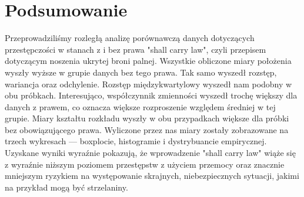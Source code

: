 \documentclass[a4paper,12pt]{article}
\begin{document}
	\newpage
	{\small \section{Podsumowanie}}
	Przeprowadziliśmy rozległą analizę porównawczą danych dotyczących przestępczości w stanach z i bez prawa "shall carry law", czyli przepisem dotyczącym noszenia ukrytej broni palnej. Wszystkie obliczone miary położenia wyszły wyższe w grupie danych bez tego prawa. Tak samo wyszedł rozstęp, wariancja oraz odchylenie. Rozstęp międzykwartylowy wyszedł nam podobny w obu próbkach. Interesująco, współczynnik zmienności wyszedł trochę większy dla danych z prawem, co oznacza większe rozproszenie względem średniej w tej grupie. Miary kształtu rozkładu wyszły w obu przypadkach większe dla próbki bez obowiązującego prawa. Wyliczone przez nas miary zostały zobrazowane na trzech wykresach --- boxplocie, histogramie i dystrybuancie empirycznej. 
	Uzyskane wyniki wyraźnie pokazują, że wprowadzenie "shall carry law" wiąże się z wyraźnie niższym poziomem przestępstw z użyciem przemocy oraz znacznie mniejszym ryzykiem na występowanie skrajnych, niebezpiecznych sytuacji, jakimi na przykład mogą być strzelaniny.


	
	
	
	
	



	
\end{document}

